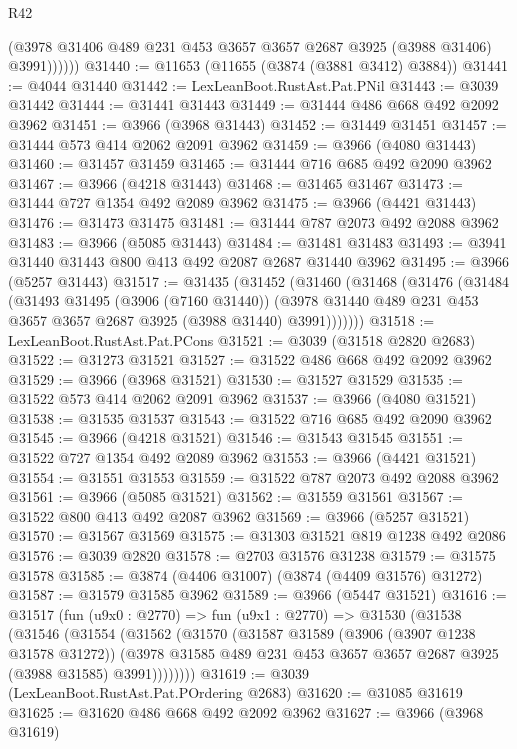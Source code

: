 \begin{lexlean}{R42}
\begin{coremodule}
              (@3978 @31406 @489 @231 @453 @3657 @3657 @2687 @3925 (@3988 @31406) @3991))))))
@31440 := @11653 (@11655 (@3874 (@3881 @3412) @3884))
@31441 := @4044 @31440
@31442 := LexLeanBoot.RustAst.Pat.PNil
@31443 := @3039 @31442
@31444 := @31441 @31443
@31449 := @31444 @486 @668 @492 @2092 @3962
@31451 := @3966 (@3968 @31443)
@31452 := @31449 @31451
@31457 := @31444 @573 @414 @2062 @2091 @3962
@31459 := @3966 (@4080 @31443)
@31460 := @31457 @31459
@31465 := @31444 @716 @685 @492 @2090 @3962
@31467 := @3966 (@4218 @31443)
@31468 := @31465 @31467
@31473 := @31444 @727 @1354 @492 @2089 @3962
@31475 := @3966 (@4421 @31443)
@31476 := @31473 @31475
@31481 := @31444 @787 @2073 @492 @2088 @3962
@31483 := @3966 (@5085 @31443)
@31484 := @31481 @31483
@31493 := @3941 @31440 @31443 @800 @413 @492 @2087 @2687 @31440 @3962
@31495 := @3966 (@5257 @31443)
@31517 := @31435
    (@31452
      (@31460
        (@31468
          (@31476
            (@31484
              (@31493
                @31495
                (@3906 (@7160 @31440))
                (@3978 @31440 @489 @231 @453 @3657 @3657 @2687 @3925 (@3988 @31440) @3991)))))))
@31518 := LexLeanBoot.RustAst.Pat.PCons
@31521 := @3039 (@31518 @2820 @2683)
@31522 := @31273 @31521
@31527 := @31522 @486 @668 @492 @2092 @3962
@31529 := @3966 (@3968 @31521)
@31530 := @31527 @31529
@31535 := @31522 @573 @414 @2062 @2091 @3962
@31537 := @3966 (@4080 @31521)
@31538 := @31535 @31537
@31543 := @31522 @716 @685 @492 @2090 @3962
@31545 := @3966 (@4218 @31521)
@31546 := @31543 @31545
@31551 := @31522 @727 @1354 @492 @2089 @3962
@31553 := @3966 (@4421 @31521)
@31554 := @31551 @31553
@31559 := @31522 @787 @2073 @492 @2088 @3962
@31561 := @3966 (@5085 @31521)
@31562 := @31559 @31561
@31567 := @31522 @800 @413 @492 @2087 @3962
@31569 := @3966 (@5257 @31521)
@31570 := @31567 @31569
@31575 := @31303 @31521 @819 @1238 @492 @2086
@31576 := @3039 @2820
@31578 := @2703 @31576 @31238
@31579 := @31575 @31578
@31585 := @3874 (@4406 @31007) (@3874 (@4409 @31576) @31272)
@31587 := @31579 @31585 @3962
@31589 := @3966 (@5447 @31521)
@31616 := @31517
    (fun (u9x0 : @2770) =>
    fun (u9x1 : @2770) =>
    @31530
      (@31538
        (@31546
          (@31554
            (@31562
              (@31570
                (@31587
                  @31589
                  (@3906 (@3907 @1238 @31578 @31272))
                  (@3978 @31585 @489 @231 @453 @3657 @3657 @2687 @3925 (@3988 @31585) @3991))))))))
@31619 := @3039 (LexLeanBoot.RustAst.Pat.POrdering @2683)
@31620 := @31085 @31619
@31625 := @31620 @486 @668 @492 @2092 @3962
@31627 := @3966 (@3968 @31619)

\end{coremodule}
\end{lexlean}
